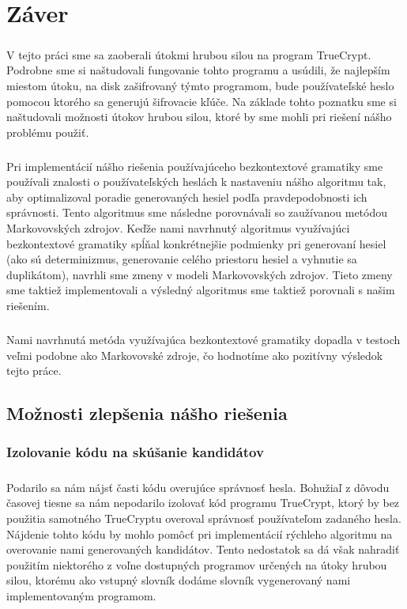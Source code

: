 \chapter{Záver}

\paragraph{}
V tejto práci sme sa zaoberali útokmi hrubou silou na program TrueCrypt. Podrobne sme si naštudovali fungovanie tohto programu a usúdili, že najlepším miestom útoku, na disk zašifrovaný týmto programom, bude používateľské heslo pomocou ktorého sa generujú šifrovacie kľúče. Na základe tohto poznatku sme si naštudovali možnosti útokov hrubou silou, ktoré by sme mohli pri riešení nášho problému použiť.

\paragraph{}
Pri implementácií nášho riešenia používajúceho bezkontextové gramatiky sme používali znalosti o používateľských heslách k nastaveniu nášho algoritmu tak, aby optimalizoval poradie generovaných hesiel podľa pravdepodobnosti ich správnosti. Tento algoritmus sme následne porovnávali so zaužívanou metódou Markovovských zdrojov. Keďže nami navrhnutý algoritmus využívajúci bezkontextové gramatiky spĺňal konkrétnejšie podmienky pri generovaní hesiel (ako sú determinizmus, generovanie celého priestoru hesiel a vyhnutie sa duplikátom), navrhli sme zmeny v modeli Markovovských zdrojov. Tieto zmeny sme taktiež implementovali a výsledný algoritmus sme taktiež porovnali s našim riešením.

\paragraph{}
Nami navrhnutá metóda využívajúca bezkontextové gramatiky dopadla v testoch veľmi podobne ako Markovovské zdroje, čo hodnotíme ako pozitívny výsledok tejto práce.

\section{Možnosti zlepšenia nášho riešenia}
\subsection{Izolovanie kódu na skúšanie kandidátov}
\paragraph{}
Podarilo sa nám nájsť časti kódu overujúce správnosť hesla. Bohužiaľ z dôvodu časovej tiesne sa nám nepodarilo izolovať kód programu TrueCrypt, ktorý by bez použitia samotného TrueCryptu overoval správnosť používateľom zadaného hesla. Nájdenie tohto kódu by mohlo pomôcť pri implementácií rýchleho algoritmu na overovanie nami generovaných kandidátov. Tento nedostatok sa dá však nahradiť použitím niektorého z voľne dostupných programov určených na útoky hrubou silou, ktorému ako vstupný slovník dodáme slovník vygenerovaný nami implementovaným programom.

